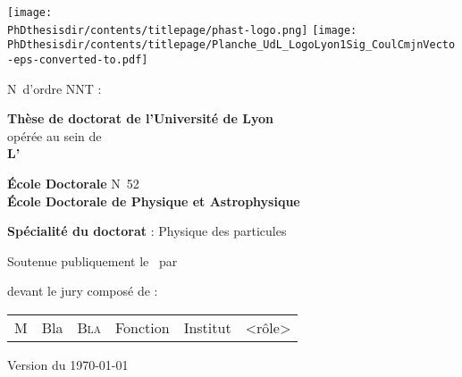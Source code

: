 \thispagestyle{empty}
\begin{center}
\large

\texttt{[image: \\PhDthesisdir/contents/titlepage/phast-logo.png]}
\hfill
\texttt{[image: \\PhDthesisdir/contents/titlepage/Planche\_UdL\_LogoLyon1Sig\_CoulCmjnVecto-eps-converted-to.pdf]}

\vspace{5mm}
\begin{flushleft}
N\degree\ d'ordre NNT : 
\end{flushleft}

\vspace{5mm}

{\LARGE \textbf{Thèse de doctorat de l'Université de Lyon}}\\
opérée au sein de\\
\textbf{L'\insertinstitute}

\vspace{1cm}

\textbf{École Doctorale} N\degree\ 52\\
\textbf{École Doctorale de Physique et Astrophysique}

\vspace{1cm}

\textbf{Spécialité du doctorat} : Physique des particules

\vspace{1.5cm}

Soutenue publiquement le \insertdate\ par

\vspace{1cm}

{\LARGE \textbf{\insertauthor}}

\vspace{1.5cm}

\textbf{\huge\inserttitle}

\vfill
devant le jury composé de :
\vspace{5mm}

\begin{tabular}{llllcc}
M & Bla & \textsc{Bla} & Fonction & Institut & <rôle>
\end{tabular}

\vspace{1cm}
{\scriptsize Version du \today}
\end{center}